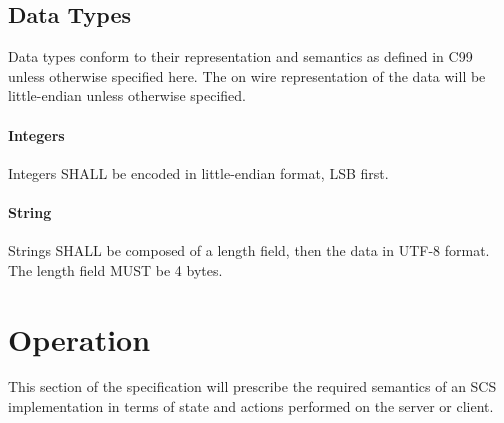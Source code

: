 \documentclass[12pt]{article}
\begin{document}
\subsection{Data Types}
Data types conform to their representation and semantics as defined in C99 unless
otherwise specified here. The on wire representation of the data will be
little-endian unless otherwise specified.
\paragraph{Integers} Integers SHALL be encoded in little-endian format, LSB first.
\paragraph{String} Strings SHALL be composed of a length field, then the data in UTF-8 format. The
length field MUST be 4 bytes.

\section{Operation}
This section of the specification will prescribe the required semantics of an
SCS implementation in terms of state and actions performed on the server or
client.
\end{document}
